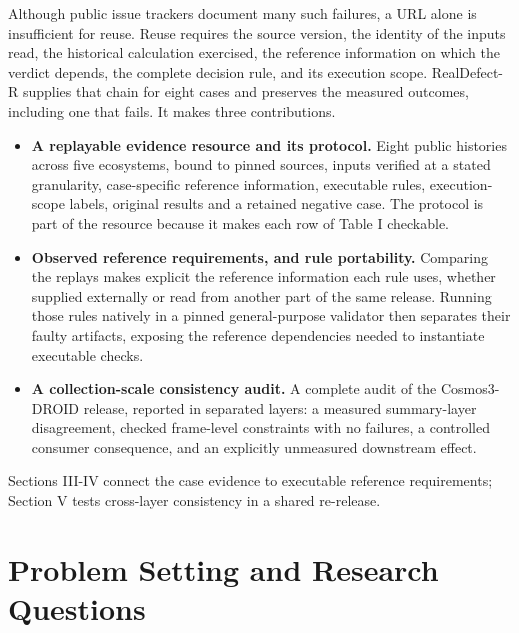 \documentclass[conference]{IEEEtran}
\begin{document}
Although public issue trackers document many such failures, a URL alone is insufficient for reuse. Reuse requires the source version, the identity of the inputs read, the historical calculation exercised, the reference information on which the verdict depends, the complete decision rule, and its execution scope. \mbox{RealDefect-R} supplies that chain for eight cases and preserves the measured outcomes, including one that fails. It makes three contributions.\par

\begin{itemize}

\item \textbf{A replayable evidence resource and its protocol.} Eight public histories across five ecosystems, bound to pinned sources, inputs verified at a stated granularity, case-specific reference information, executable rules, execution-scope labels, original results and a retained negative case. The protocol is part of the resource because it makes each row of Table I checkable.

\item \textbf{Observed reference requirements, and rule portability.} Comparing the replays makes explicit the reference information each rule uses, whether supplied externally or read from another part of the same release. Running those rules natively in a pinned general-purpose validator then separates their faulty artifacts, exposing the reference dependencies needed to instantiate executable checks.

\item \textbf{A collection-scale consistency audit.} A complete audit of the Cosmos3-DROID release, reported in separated layers: a measured summary-layer disagreement, checked frame-level constraints with no failures, a controlled consumer consequence, and an explicitly unmeasured downstream effect.

\end{itemize}

Sections III-IV connect the case evidence to executable reference requirements; Section V tests cross-layer consistency in a shared re-release.\par

\section{Problem Setting and Research Questions}
\end{document}
